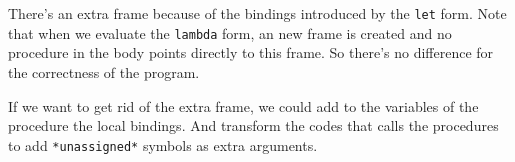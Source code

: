 \documentclass[a4paper,12pt]{article}
\begin{document}
There's an extra frame because of the bindings introduced by the
\lstinline!let! form.  Note that when we evaluate the
\lstinline!lambda! form, an new frame is created and no procedure in
the body points directly to this frame.  So there's no difference for
the correctness of the program.

If we want to get rid of the extra frame, we could add to the
variables of the procedure the local bindings.  And transform the
codes that calls the procedures to add \lstinline!*unassigned*!
symbols as extra arguments.
\end{document}
